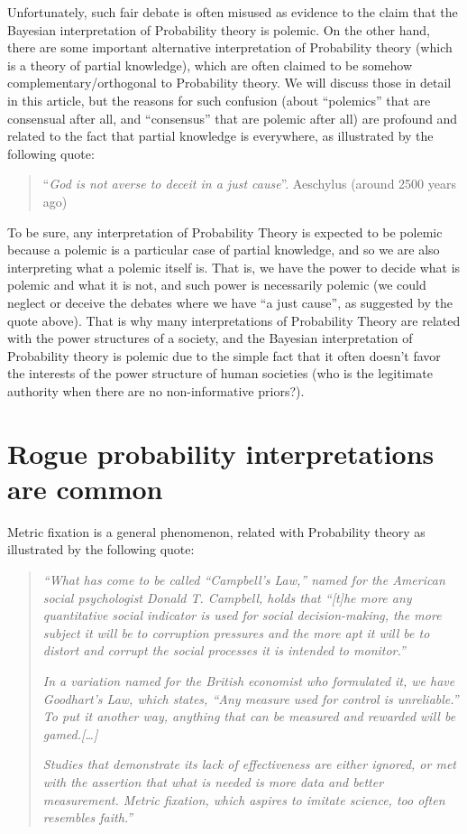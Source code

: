 \documentclass[11pt]{book}
\begin{document}
Unfortunately, such fair debate is often misused as evidence to the
claim that the Bayesian interpretation of Probability theory is polemic.
On the other hand, there are some important alternative interpretation
of Probability theory (which is a theory of partial knowledge), which
are often claimed to be somehow complementary/orthogonal to Probability
theory. We will discuss those in detail in this article, but the reasons
for such confusion (about ``polemics'' that are consensual after all,
and ``consensus'' that are polemic after all) are profound and related
to the fact that partial knowledge is everywhere, as illustrated by the
following quote:

\begin{quote}
``\emph{God is not averse to deceit in a just cause}''. Aeschylus
(around 2500 years ago)
\end{quote}

To be sure, any interpretation of Probability Theory is expected to be
polemic because a polemic is a particular case of partial knowledge, and
so we are also interpreting what a polemic itself is. That is, we have
the power to decide what is polemic and what it is not, and such power
is necessarily polemic (we could neglect or deceive the debates where we
have ``a just cause'', as suggested by the quote above). That is why
many interpretations of Probability Theory are related with the power
structures of a society, and the Bayesian interpretation of Probability
theory is polemic due to the simple fact that it often doesn't favor the
interests of the power structure of human societies (who is the
legitimate authority when there are no non-informative priors?).

\hypertarget{rogue-probability-interpretations-are-common}{%
\section{Rogue probability interpretations are
common}\label{rogue-probability-interpretations-are-common}}

Metric fixation is a general phenomenon, related with Probability theory
as illustrated by the following quote:

\begin{quote}
\emph{``What has come to be called ``Campbell's Law,'' named for the
American social psychologist Donald T. Campbell, holds that ``{[}t{]}he
more any quantitative social indicator is used for social
decision-making, the more subject it will be to corruption pressures and
the more apt it will be to distort and corrupt the social processes it
is intended to monitor.'' }

\emph{In a variation named for the British economist who formulated it,
we have Goodhart's Law, which states, ``Any measure used for control is
unreliable.'' To put it another way, anything that can be measured and
rewarded will be gamed.{[}\ldots{]}}

\emph{Studies that demonstrate its lack of effectiveness are either
ignored, or met with the assertion that what is needed is more data and
better measurement. Metric fixation, which aspires to imitate science,
too often resembles
faith.''}\cite{muller_tyranny_2018}
\end{quote}
\end{document}
